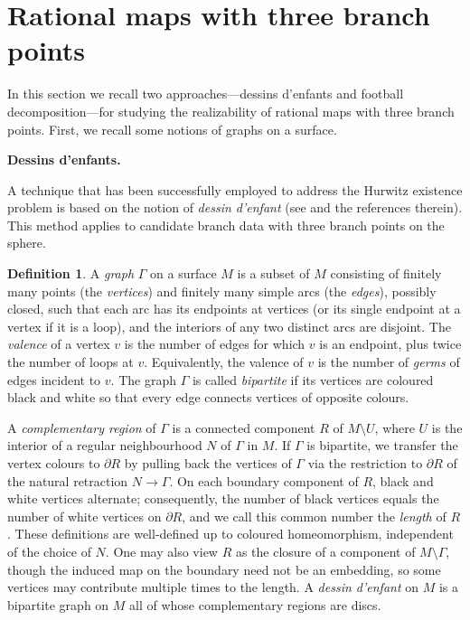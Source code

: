 \documentclass[microtype]{gtpart}     %
\theoremstyle{definition}
\newtheorem{defn}[thm]{Definition}    %
\begin{document}
\section{Rational maps with three branch points}\label{sec2}

In this section we recall two approaches---dessins d'enfants and football decomposition---for studying the realizability of rational maps with three branch points.  First, we recall some notions of graphs on a surface.

\textbf{Dessins d'enfants.}

A technique that has been successfully employed to address the Hurwitz existence problem is based on the notion of \emph{dessin d'enfant} (see \cite{AG97,PB94,SA04} and the references therein). This method applies to candidate branch data with three branch points on the sphere.

\begin{defn}\cite{P20}
A \emph{graph} $\Gamma$ on a surface $M$ is a subset of $M$ consisting of finitely many points (the \emph{vertices}) and finitely many simple arcs (the \emph{edges}), possibly closed, such that each arc has its endpoints at vertices (or its single endpoint at a vertex if it is a loop), and the interiors of any two distinct arcs are disjoint. The \emph{valence} of a vertex $v$ is the number of edges for which $v$ is an endpoint, plus twice the number of loops at $v$. Equivalently, the valence of $v$ is the number of \emph{germs} of edges incident to $v$. The graph $\Gamma$ is called \emph{bipartite} if its vertices are coloured black and white so that every edge connects vertices of opposite colours.

A \emph{complementary region} of $\Gamma$ is a connected component $R$ of $M \setminus U$, where $U$ is the interior of a regular neighbourhood $N$ of $\Gamma$ in $M$. If $\Gamma$ is bipartite, we transfer the vertex colours to $\partial R$ by pulling back the vertices of $\Gamma$ via the restriction to $\partial R$ of the natural retraction $N \to \Gamma$. On each boundary component of $R$, black and white vertices alternate; consequently, the number of black vertices equals the number of white vertices on $\partial R$, and we call this common number the \emph{length} of $R$. These definitions are well-defined up to coloured homeomorphism, independent of the choice of $N$. One may also view $R$ as the closure of a component of $M \setminus \Gamma$, though the induced map on the boundary need not be an embedding, so some vertices may contribute multiple times to the length. A \emph{dessin d'enfant} on $M$ is a bipartite graph on $M$ all of whose complementary regions are discs.
\end{defn}
\end{document}
